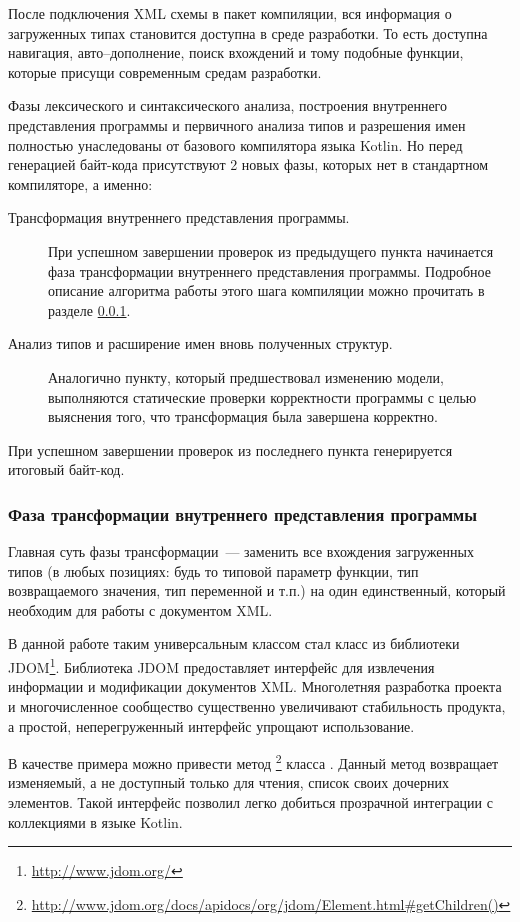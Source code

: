 После подключения XML схемы в пакет компиляции, вся информация о загруженных типах становится доступна в среде разработки. То есть доступна навигация, авто--дополнение, поиск вхождений и тому подобные функции, которые присущи современным средам разработки.

Фазы лексического и синтаксического анализа, построения внутреннего представления программы и первичного анализа типов и разрешения имен полностью унаследованы от базового компилятора языка Kotlin. Но перед генерацией байт-кода присутствуют 2 новых фазы, которых нет в стандартном компиляторе, а именно:

\begin{description}
\item[Трансформация внутреннего представления программы.] При успешном завершении проверок из предыдущего пункта начинается фаза трансформации внутреннего представления программы. Подробное описание алгоритма работы этого шага компиляции можно прочитать в разделе \ref{xml-tranformation-phase}.
\item[Анализ типов и расширение имен вновь полученных структур.]
Аналогично пункту, который предшествовал изменению модели, выполняются статические проверки корректности программы с целью выяснения того, что трансформация была завершена корректно. 
\end{description}

При успешном завершении проверок из последнего пункта генерируется итоговый байт-код.
  
\subsubsection{Фаза трансформации внутреннего представления программы}\label{xml-tranformation-phase}
Главная суть фазы трансформации~--- заменить все вхождения загруженных типов (в любых позициях: будь то типовой параметр функции, тип возвращаемого значения, тип переменной и т.п.) на один единственный, который необходим для работы с документом XML.

В данной работе таким универсальным классом стал класс  из библиотеки JDOM\footnote{\url{http://www.jdom.org/}}. Библиотека JDOM предоставляет интерфейс для извлечения информации и модификации документов XML. Многолетняя разработка проекта и многочисленное сообщество существенно увеличивают стабильность продукта, а простой, неперегруженный интерфейс упрощают использование.

В качестве примера можно привести метод \footnote{\url{http://www.jdom.org/docs/apidocs/org/jdom/Element.html\#getChildren()}} класса .
Данный метод возвращает изменяемый, а не доступный только для чтения, список своих дочерних элементов. Такой интерфейс позволил легко добиться прозрачной интеграции с коллекциями в языке Kotlin.

